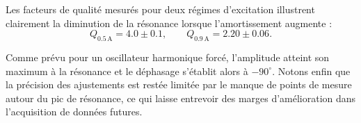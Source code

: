 Les facteurs de qualité mesurés pour deux régimes d’excitation illustrent clairement la diminution de la résonance lorsque l’amortissement augmente :
\[
Q_{0.5\,\mathrm{A}} = 4.0 \pm 0.1, \qquad
Q_{0.9\,\mathrm{A}} = 2.20 \pm 0.06.
\]

Comme prévu pour un oscillateur harmonique forcé, l’amplitude atteint son maximum à la résonance et le déphasage s’établit alors à $-90^\circ$. 
Notons enfin que la précision des ajustements est restée limitée par le manque de points de mesure autour du pic de résonance, ce qui laisse entrevoir des marges d’amélioration dans l’acquisition de données futures.



